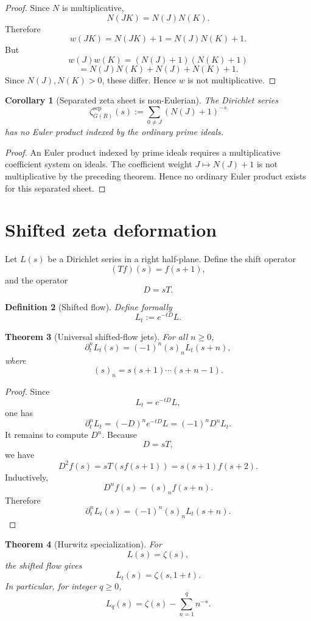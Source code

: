 \documentclass[11pt]{article}
\newtheorem{theorem}{Theorem}[section]
\newtheorem{corollary}[theorem]{Corollary}
\newtheorem{definition}[theorem]{Definition}
\begin{document}
\begin{proof}
Since \(N\) is multiplicative,
\[
N(JK)=N(J)N(K).
\]
Therefore
\[
w(JK)=N(JK)+1=N(J)N(K)+1.
\]
But
\[
w(J)w(K)
=
(N(J)+1)(N(K)+1)
\]
\[
=
N(J)N(K)+N(J)+N(K)+1.
\]
Since \(N(J),N(K)>0\), these differ. Hence \(w\) is not multiplicative.
\end{proof}

\begin{corollary}[Separated zeta sheet is non-Eulerian]
The Dirichlet series
\[
\zeta_{G(R)}^{\mathrm{sep}}(s)
:=
\sum_{0\neq J}(N(J)+1)^{-s}
\]
has no Euler product indexed by the ordinary prime ideals.
\end{corollary}

\begin{proof}
An Euler product indexed by prime ideals requires a multiplicative coefficient system on ideals. The coefficient weight \(J\mapsto N(J)+1\) is not multiplicative by the preceding theorem. Hence no ordinary Euler product exists for this separated sheet.
\end{proof}

\section{Shifted zeta deformation}

Let \(L(s)\) be a Dirichlet series in a right half-plane. Define the shift operator
\[
(Tf)(s)=f(s+1),
\]
and the operator
\[
D=sT.
\]

\begin{definition}[Shifted flow]
Define formally
\[
L_t:=e^{-tD}L.
\]
\end{definition}

\begin{theorem}[Universal shifted-flow jets]
For all \(n\ge0\),
\[
\partial_t^n L_t(s)
=
(-1)^n(s)_nL_t(s+n),
\]
where
\[
(s)_n=s(s+1)\cdots(s+n-1).
\]
\end{theorem}

\begin{proof}
Since
\[
L_t=e^{-tD}L,
\]
one has
\[
\partial_t^nL_t=(-D)^ne^{-tD}L=(-1)^nD^nL_t.
\]
It remains to compute \(D^n\). Because
\[
D=sT,
\]
we have
\[
D^2f(s)=sT(sf(s+1))=s(s+1)f(s+2).
\]
Inductively,
\[
D^nf(s)=(s)_nf(s+n).
\]
Therefore
\[
\partial_t^nL_t(s)=(-1)^n(s)_nL_t(s+n).
\]
\end{proof}

\begin{theorem}[Hurwitz specialization]
For
\[
L(s)=\zeta(s),
\]
the shifted flow gives
\[
L_t(s)=\zeta(s,1+t).
\]
In particular, for integer \(q\ge0\),
\[
L_q(s)=\zeta(s)-\sum_{n=1}^{q}n^{-s}.
\]
\end{theorem}
\end{document}
